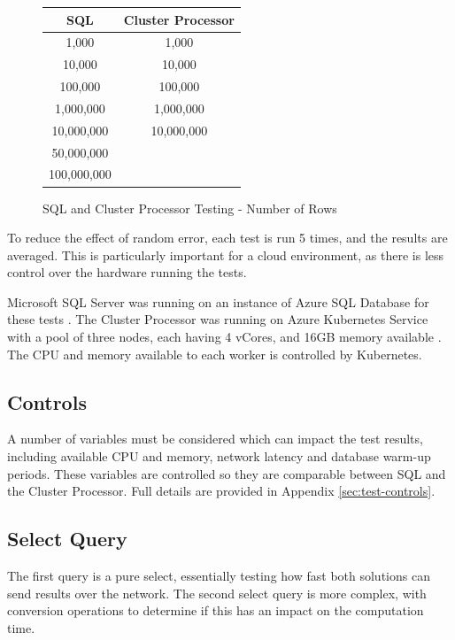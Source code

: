 \begin{figure}[ht]
	\centering
	\begin{tabular}{| c | c |}
		\hline
		\textbf{SQL} & \textbf{Cluster Processor} \\ \hline
		1,000 & 1,000 \\ \hline
		10,000 & 10,000 \\ \hline
		100,000 & 100,000 \\ \hline
		1,000,000 & 1,000,000 \\ \hline
		10,000,000 & 10,000,000 \\ \hline
		50,000,000 & \\ \hline
		100,000,000 & \\ \hline
	\end{tabular}
	\caption{SQL and Cluster Processor Testing - Number of Rows}
	\label{fig:sql-cluster-data-volumes}
\end{figure}

To reduce the effect of random error, each test is run 5 times, and the results are averaged. This is particularly important for a cloud environment, as there is less control over the hardware running the tests.

Microsoft SQL Server was running on an instance of Azure SQL Database for these tests \cite{azuresqldatabase}. The Cluster Processor was running on Azure Kubernetes Service with a pool of three nodes, each having 4 vCores, and 16GB memory available \cite{azurekubernetesservice}. The CPU and memory available to each worker is controlled by Kubernetes.

\pagebreak
\subsection{Controls}
A number of variables must be considered which can impact the test results, including available CPU and memory, network latency and database warm-up periods. These variables are controlled so they are comparable between SQL and the Cluster Processor. Full details are provided in Appendix \ref{sec:test-controls}.

\subsection{Select Query}
The first query is a pure select, essentially testing how fast both solutions can send results over the network. 
The second select query is more complex, with conversion operations to determine if this has an impact on the computation time. 

